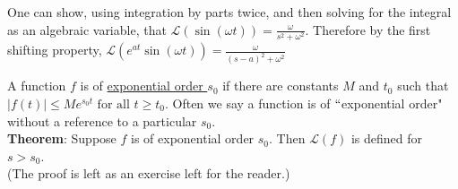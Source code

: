 \documentclass{ximera}
\begin{document}
 One can show, using integration by parts twice, and then solving for the integral as an algebraic variable, that $\displaystyle \mathcal{L}(\sin{(\omega t)})=\frac{\omega}{s^2+\omega^2}$.   Therefore by the first shifting property, $\displaystyle \mathcal{L}(e^{at}\sin{(\omega t)})=\frac{\omega}{(s-a)^2+\omega^2}$

 \newpage
 

 A function $f$ is of \underline{exponential order $s_{0}$} if there are constants $M$ and $t_{0}$ such that $\displaystyle|f(t)|\leq Me^{s_{0}t}\mbox{ for all }t\geq t_{0}$.   Often we say a function is of $``$exponential order" without a reference to a particular $s_{0}$.\\


 \textbf{Theorem}:  Suppose $f$ is of exponential order $s_{0}$.  Then $\mathcal{L}(f)$ is defined for $s>s_{0}$.\\

 (The proof is left as an exercise left for the reader.)
\end{document}
